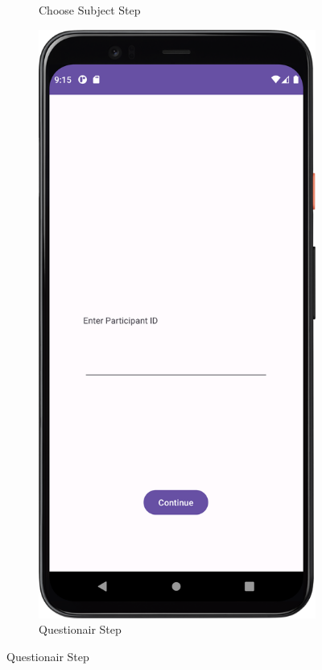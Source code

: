 \begin{figure}[htbp]
\begin{subfigure}[b]{0.25\textwidth}
        \caption{Choose Subject Step}
        \label{subfig:chooseTestSubject2}
    \end{subfigure}
    \hspace{1cm}
    \begin{subfigure}[b]{0.25\textwidth}
        \centering
        \includegraphics[width=\textwidth]{content/06_demonstration_of_the_artifact/Screenshot_ParticipantSelectionScreen.png}
        \caption{Questionair Step}
        \label{subfig:Questionair2}
    \end{subfigure}


\end{figure}
